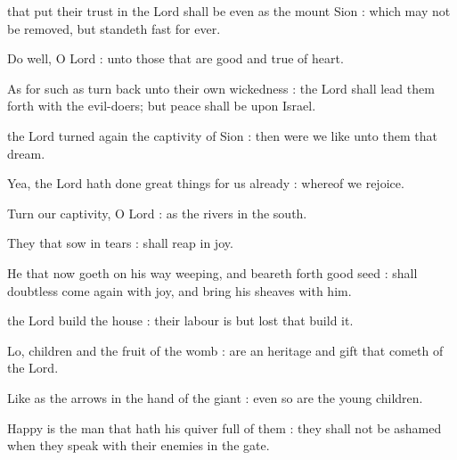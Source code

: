 
 that put their trust in the Lord shall be even as the mount Sion : which may not be removed, but standeth fast for ever.\par
{}
Do well, O Lord : unto those that are good and true of heart.\par
{}As for such as turn back unto their own wickedness : the Lord shall lead them forth with the evil-doers; but peace shall be upon Israel.\par



 the Lord turned again the captivity of Sion : then were we like unto them that dream.\par
{}
Yea, the Lord hath done great things for us already : whereof we rejoice.\par
{}Turn our captivity, O Lord : as the rivers in the south.\par
{}They that sow in tears : shall reap in joy.\par
{}He that now goeth on his way weeping, and beareth forth good seed : shall doubtless come again with joy, and bring his sheaves with him.\par


 the Lord build the house : their labour is but lost that build it.\par
{}
Lo, children and the fruit of the womb : are an heritage and gift that cometh of the Lord.\par
{}Like as the arrows in the hand of the giant : even so are the young children.\par
{}Happy is the man that hath his quiver full of them : they shall not be ashamed when they speak with their enemies in the gate.\par

